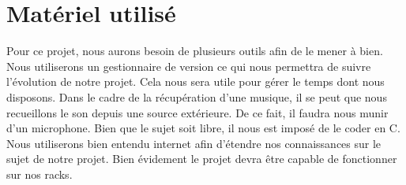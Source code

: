 \documentclass[a4paper,12pt]{article}
\begin{document}
\newpage

\section{Matériel utilisé}

Pour ce projet, nous aurons besoin de plusieurs outils afin de le mener à bien. Nous utiliserons un gestionnaire de version ce qui nous permettra de suivre l'évolution de notre projet. Cela nous sera utile pour gérer le temps dont nous disposons. Dans le cadre de la récupération d'une musique, il se peut que nous recueillons le son depuis une source extérieure. De ce fait, il faudra nous munir d'un microphone. Bien que le sujet soit libre, il nous est imposé de le coder en C. Nous utiliserons bien entendu internet afin d'étendre nos connaissances sur le sujet de notre projet. Bien évidement le projet devra être capable de fonctionner sur nos racks.
\end{document}
